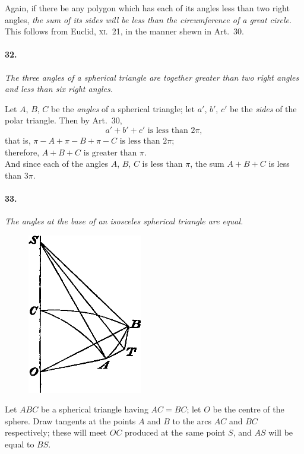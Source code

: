 \documentclass{book}[2004/02/16]
\begin{document}
\begin{mainmatter}
\begin{spacing}{1.3}
Again, if there be any polygon which has each of its angles
less than two right angles, \textit{the sum of its sides will be less than the
circumference of a great circle}. This follows from Euclid, \textsc{xi.}~21,
in the manner shewn in Art.~30.

\paragraph{32.} \textit{The three angles of a spherical triangle are together greater
than two right angles and less than six right angles.}

Let $A$, $B$, $C$ be the \textit{angles} of a spherical triangle; let $a'$, $b'$, $c'$
be the \textit{sides} of the polar triangle. Then by Art.~30,
\[
a'+b'+c'\text{ is less than }2\pi,
\]
that is,\hfill
$\displaystyle \pi-A+\pi-B+\pi-C\text{ is less than }2\pi;$\hfill{\phantom{that is}}\\
therefore,\hfill
$\displaystyle A+B+C\text{ is greater than }\pi$.\hfill{}\\

And since each of the angles $A$, $B$, $C$ is less than $\pi$, the sum
$A+B+C$ is less than $3\pi$.

\paragraph{33.} \textit{The angles at the base of an isosceles spherical triangle are
equal.}
\begin{figure}[htp]
\centering
\includegraphics[width=5.0cm]{images/024fc}
\end{figure}

Let $ABC$ be a spherical triangle having $AC=BC$; let $O$ be the
centre of the sphere. Draw tangents at the points $A$ and $B$ to the
arcs $AC$ and $BC$ respectively; these will meet $OC$ produced at the
same point $S$, and $AS$ will be equal to $BS$.


\end{spacing}
\end{mainmatter}
\end{document}
